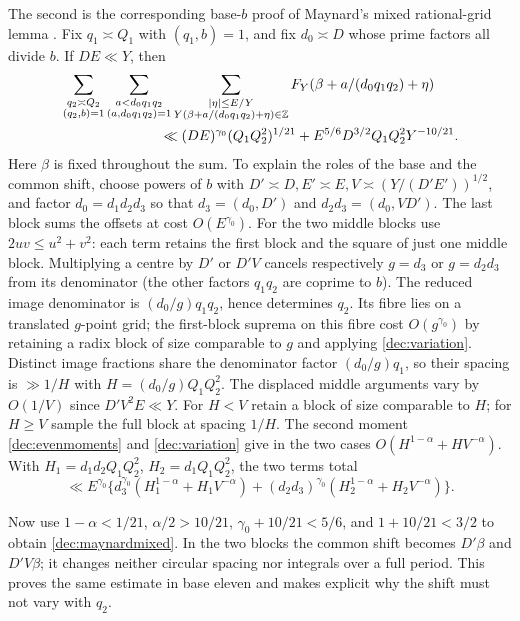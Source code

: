 \documentclass[11pt,a4paper]{article}
\theoremstyle{paperplain}
\numberwithin{equation}{section}
\begin{document}
The second is the corresponding base-$b$ proof of Maynard's mixed
rational-grid lemma \cite[Lemma 10.7]{Maynard2019}.
Fix $q_1\asymp Q_1$ with $(q_1,b)=1$, and fix $d_0\asymp D$
whose prime factors all divide $b$. If $DE\ll Y$, then
\begin{align}
 &\sum_{\substack{q_2\asymp Q_2\\(q_2,b)=1}}
 \sum_{\substack{a<d_0q_1q_2\\(a,d_0q_1q_2)=1}}
 \sum_{\substack{|\eta|\le E/Y\\Y(\beta+a/(d_0q_1q_2)+\eta)\in\mathbb Z}}
 F_Y(\beta+a/(d_0q_1q_2)+\eta)\notag\\
 &\hspace{25mm}\ll (DE)^{\gamma_0}(Q_1Q_2^2)^{1/21}
       +E^{5/6}D^{3/2}Q_1Q_2^2Y^{-10/21}.
 \label{dec:maynardmixed}
\end{align}
Here $\beta$ is fixed throughout the sum. To explain the roles of the base
and the common shift, choose powers of $b$ with
$D'\asymp D,E'\asymp E,V\asymp(Y/(D'E'))^{1/2}$, and factor
$d_0=d_1d_2d_3$ so that $d_3=(d_0,D')$ and
$d_2d_3=(d_0,VD')$. The last block sums the offsets at cost $O(E^{\gamma_0})$.
For the two middle blocks use $2uv\le u^2+v^2$: each term retains
the first block and the square of just one middle block. Multiplying
a centre by $D'$ or $D'V$ cancels respectively $g=d_3$ or $g=d_2d_3$
from its denominator (the other factors $q_1q_2$ are coprime to $b$).
The reduced image denominator is $(d_0/g)q_1q_2$, hence determines
$q_2$. Its fibre lies on a translated $g$-point grid; the first-block
suprema on this fibre cost $O(g^{\gamma_0})$ by retaining a radix
block of size comparable to $g$ and applying \eqref{dec:variation}.
Distinct image fractions share the denominator factor $(d_0/g)q_1$,
so their spacing is $\gg 1/H$ with $H=(d_0/g)Q_1Q_2^2$.
The displaced middle arguments vary by $O(1/V)$ since $D'V^2E\ll Y$.
For $H<V$ retain a block of size comparable to $H$; for $H\ge V$
sample the full block at spacing $1/H$. The second moment
\eqref{dec:evenmoments} and \eqref{dec:variation} give in the two
cases $O(H^{1-\alpha}+HV^{-\alpha})$. With
$H_1=d_1d_2Q_1Q_2^2$, $H_2=d_1Q_1Q_2^2$, the two terms total
\[
 \ll E^{\gamma_0}\{d_3^{\gamma_0}(H_1^{1-\alpha}+H_1V^{-\alpha})
 +(d_2d_3)^{\gamma_0}(H_2^{1-\alpha}+H_2V^{-\alpha})\}.
\]

Now use $1-\alpha<1/21$, $\alpha/2>10/21$,
$\gamma_0+10/21<5/6$, and $1+10/21<3/2$ to obtain
\eqref{dec:maynardmixed}. In the two blocks the common shift becomes
$D'\beta$ and $D'V\beta$; it changes neither circular spacing nor integrals
over a full period. This proves the same estimate in base eleven and
makes explicit why the shift must not vary with $q_2$.
\end{document}
